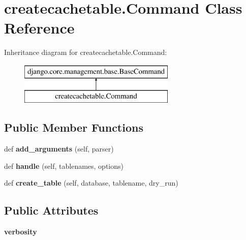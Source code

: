 \hypertarget{classcreatecachetable_1_1_command}{}\section{createcachetable.\+Command Class Reference}
\label{classcreatecachetable_1_1_command}
Inheritance diagram for createcachetable.\+Command\+:\begin{figure}[H]
\begin{center}
\leavevmode
\includegraphics[height=2.000000cm]{classcreatecachetable_1_1_command}
\end{center}
\end{figure}
\subsection*{Public Member Functions}
\begin{DoxyCompactItemize}
\item 
\mbox{\label{classcreatecachetable_1_1_command_a70a06b94c7015fd361ea8fac399a3854}} 
def {\bfseries add\+\_\+arguments} (self, parser)
\item 
\mbox{\label{classcreatecachetable_1_1_command_aca11f777912fe82b2c9e57fd5f5b5593}} 
def {\bfseries handle} (self, tablenames, options)
\item 
\mbox{\label{classcreatecachetable_1_1_command_a4d667d0d49b55830ff3a66d83298a561}} 
def {\bfseries create\+\_\+table} (self, database, tablename, dry\+\_\+run)
\end{DoxyCompactItemize}
\subsection*{Public Attributes}
\begin{DoxyCompactItemize}
\item 
\mbox{\label{classcreatecachetable_1_1_command_ac52e07df3789c6e6299fd3cc73a3617d}} 
{\bfseries verbosity}
\end{DoxyCompactItemize}
